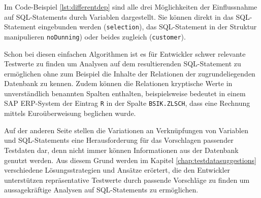 Im Code-Beispiel \ref{lst:differentdep} sind alle drei Möglichkeiten der Einflussnahme auf SQL-Statements durch Variablen dargestellt.
Sie können direkt in das SQL-Statement eingebunden werden (\texttt{selection}), das SQL-Statement in der Struktur manipulieren \texttt{noDunning}) oder beides zugleich (\texttt{customer}).

Schon bei diesen einfachen Algorithmen ist es für Entwickler schwer relevante Testwerte zu finden um Analysen auf dem resultierenden SQL-Statement zu ermöglichen ohne zum Beispiel die Inhalte der Relationen der zugrundeliegenden Datenbank zu kennen.
Zudem können die Relationen kryptische Werte in unverständlich benannten Spalten enthalten, beispielsweise bedeutet in einem SAP ERP-System der Eintrag \texttt{R} in der Spalte \texttt{BSIK.ZLSCH}, dass eine Rechnung mittels Euroüberweisung beglichen wurde.

Auf der anderen Seite stellen die Variationen an Verknüpfungen von Variablen und SQL-Statements eine Herausforderung für das Vorschlagen passender Testdaten dar, denn nicht immer können Informationen aus der Datenbank genutzt werden.
Aus diesem Grund werden im Kapitel \ref{chap:testdatasuggestions} verschiedene Lösungsstrategien und Ansätze erörtert, die den Entwickler unterstützen repräsentative Testwerte durch passende Vorschläge zu finden um aussagekräftige Analysen auf SQL-Statements zu ermöglichen.